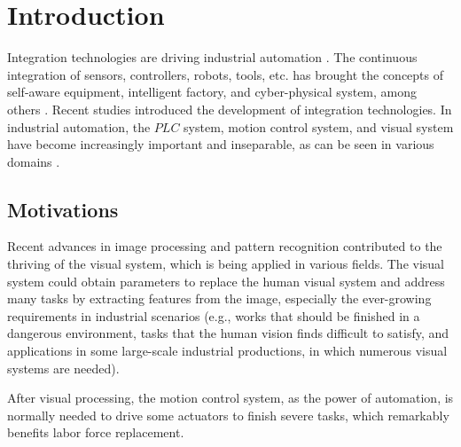 \documentclass[journal,UTF8]{IEEEtran}
\begin{document}
	\IEEEpeerreviewmaketitle
	
	
	
	\section{Introduction}
	Integration technologies are driving industrial automation \cite{Kazmierkowski2007Integration}. The continuous integration of sensors, controllers, robots, tools, etc. has brought the concepts of self-aware equipment, intelligent factory, and cyber-physical system, among others \cite{Wan2018An,Chekired2018Industrial}. Recent studies  \cite{Colombo2006An,Vaccaro2010An,Dean2017Integration} introduced the development of integration technologies. In industrial automation, the $PLC$ system, motion control system, and visual system have become increasingly important and inseparable, as can be seen in various domains \cite{Chang2006Motion,Feng2005Practical}. %
	
	\subsection{Motivations}
	Recent advances in image processing and pattern recognition contributed to the thriving of the visual system, which is being applied in various fields. The visual system could obtain parameters to replace the human visual system and address many tasks by extracting features from the image, especially the ever-growing requirements in industrial scenarios (e.g., works that should be finished in a dangerous environment, tasks that the human vision finds difficult to satisfy, and applications in some large-scale industrial productions, in which numerous visual systems are needed). 
	
	After visual processing, the motion control system, as the power of automation, is normally needed to drive some actuators to finish severe tasks, which remarkably benefits labor force replacement. 
	
\end{document}
